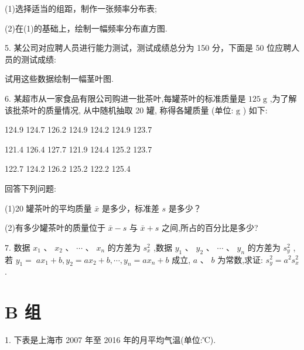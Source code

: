 \documentclass[10pt]{article}
\begin{document}
(1)选择适当的组距，制作一张频率分布表;

(2)在(1)的基础上，绘制一幅频率分布直方图.

5. 某公司对应聘人员进行能力测试，测试成绩总分为 150 分，下面是 50 位应聘人员的测试成绩:

\begin{center}
\end{center}

试用这些数据绘制一幅茎叶图.

6. 某超市从一家食品有限公司购进一批茶叶,每罐茶叶的标准质量是 \({125}\mathrm{\;g}\) ,为了解该批茶叶的质量情况, 从中随机抽取 20 罐, 称得各罐质量 (单位: \(\mathrm{g}\) ) 如下:

124.9 124.7 126.2 124.9 124.2 124.9 123.7

121.4 126.4 127.7 121.9 124.4 125.2 123.7

122.7 124.2 126.2 125.2 122.2 125.4

回答下列问题:

(1)20 罐茶叶的平均质量 \(\bar{x}\) 是多少，标准差 \(s\) 是多少？

(2)有多少罐茶叶的质量位于 \(\bar{x} - s\) 与 \(\bar{x} + s\) 之间,所占的百分比是多少?

7. 数据 \({x}_{1}\text{ 、 }{x}_{2}\text{ 、 }\cdots \text{ 、 }{x}_{n}\) 的方差为 \({s}_{x}^{2}\) ,数据 \({y}_{1}\text{ 、 }{y}_{2}\text{ 、 }\cdots \text{ 、 }{y}_{n}\) 的方差为 \({s}_{y}^{2}\) ,若 \({y}_{1} = \; a{x}_{1} + b,{y}_{2} = a{x}_{2} + b,\cdots ,{y}_{n} = a{x}_{n} + b\) 成立, \(a\text{ 、 }b\) 为常数,求证: \({s}_{y}^{2} = {a}^{2}{s}_{x}^{2}\) .

\section*{B 组}

1. 下表是上海市 2007 年至 2016 年的月平均气温(单位:℃).
\end{document}
